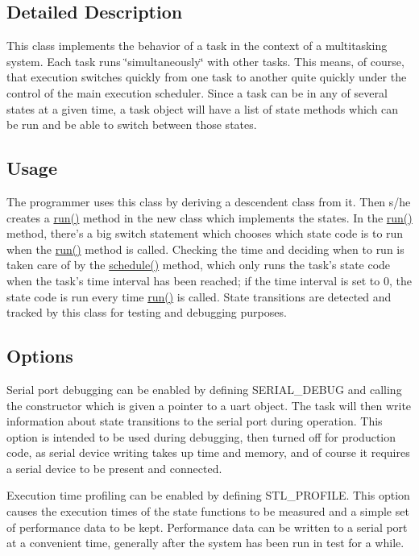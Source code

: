 \subsection{Detailed Description}
This class implements the behavior of a task in the context of a multitasking system. Each task runs \char`\"{}simultaneously\char`\"{} with other tasks. This means, of course, that execution switches quickly from one task to another quite quickly under the control of the main execution scheduler. Since a task can be in any of several states at a given time, a task object will have a list of state methods which can be run and be able to switch between those states.\hypertarget{classstl__task_task_usage}{}\subsection{Usage}\label{classstl__task_task_usage}
The programmer uses this class by deriving a descendent class from it. Then s/he creates a \hyperlink{classstl__task_a35f8eccc4a9c6737d217402b3cb0ffee}{run()} method in the new class which implements the states. In the \hyperlink{classstl__task_a35f8eccc4a9c6737d217402b3cb0ffee}{run()} method, there's a big switch statement which chooses which state code is to run when the \hyperlink{classstl__task_a35f8eccc4a9c6737d217402b3cb0ffee}{run()} method is called. Checking the time and deciding when to run is taken care of by the \hyperlink{classstl__task_a86a54618c911663e235f07fba78c728a}{schedule()} method, which only runs the task's state code when the task's time interval has been reached; if the time interval is set to 0, the state code is run every time \hyperlink{classstl__task_a35f8eccc4a9c6737d217402b3cb0ffee}{run()} is called. State transitions are detected and tracked by this class for testing and debugging purposes.\hypertarget{classstl__task_task_options}{}\subsection{Options}\label{classstl__task_task_options}
\begin{DoxyItemize}
\item Serial port debugging can be enabled by defining S\-E\-R\-I\-A\-L\-\_\-\-D\-E\-B\-U\-G and calling the constructor which is given a pointer to a uart object. The task will then write information about state transitions to the serial port during operation. This option is intended to be used during debugging, then turned off for production code, as serial device writing takes up time and memory, and of course it requires a serial device to be present and connected. \item Execution time profiling can be enabled by defining S\-T\-L\-\_\-\-P\-R\-O\-F\-I\-L\-E. This option causes the execution times of the state functions to be measured and a simple set of performance data to be kept. Performance data can be written to a serial port at a convenient time, generally after the system has been run in test for a while.\end{DoxyItemize}
